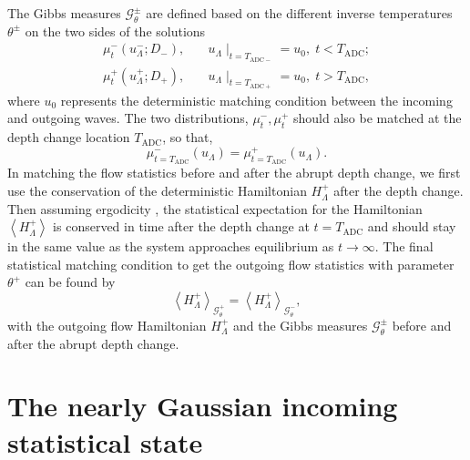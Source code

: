 \documentclass[9pt,twocolumn,twoside,lineno]{pnas-new}
\begin{document}
The Gibbs measures $\mathcal{G}_{\theta}^{\pm}$ are defined based
on the different inverse temperatures $\theta^{\pm}$ on the two sides
of the solutions
\[
\begin{aligned}\mu_{t}^{-}\left(u_{\Lambda}^{-};D_{-}\right), & \quad u_{\Lambda}\mid_{t=T_{\mathrm{ADC}-}}=u_{0},\;t<T_{\mathrm{ADC}};\\
\mu_{t}^{+}\left(u_{\Lambda}^{+};D_{+}\right), & \quad u_{\Lambda}\mid_{t=T_{\mathrm{ADC}+}}=u_{0},\;t>T_{\mathrm{ADC}},
\end{aligned}
\]
where $u_{0}$ represents the deterministic matching condition between
the incoming and outgoing waves. The two distributions, $\mu_{t}^{-},\mu_{t}^{+}$
should also be matched at the depth change location $T_{\mathrm{ADC}}$,
so that,
\[
\mu_{t=T_{\mathrm{ADC}}}^{-}\left(u_{\Lambda}\right)=\mu_{t=T_{\mathrm{ADC}}}^{+}\left(u_{\Lambda}\right).
\]
In matching the flow statistics before and after the abrupt depth
change, we first use the conservation of the deterministic Hamiltonian
$H_{\Lambda}^{+}$ after the depth change. Then assuming ergodicity
\cite{abramov2003hamiltonian,majda2006nonlinear}, the statistical
expectation for the Hamiltonian $\left\langle H_{\Lambda}^{+}\right\rangle $
is conserved in time after the depth change at $t=T_{\mathrm{ADC}}$
and should stay in the same value as the system approaches equilibrium
as $t\rightarrow\infty$. The final statistical matching condition
to get the outgoing flow statistics with parameter $\theta^{+}$ can
be found by
\begin{equation}
\left\langle H_{\Lambda}^{+}\right\rangle _{\mathcal{G}_{\theta}^{+}}=\left\langle H_{\Lambda}^{+}\right\rangle _{\mathcal{G}_{\theta}^{-}},\label{eq:matching}
\end{equation}
with the outgoing flow Hamiltonian $H_{\Lambda}^{+}$ and the Gibbs
measures $\mathcal{G}_{\theta}^{\pm}$ before and after the abrupt
depth change.

\section{The nearly Gaussian incoming statistical state}
\end{document}
